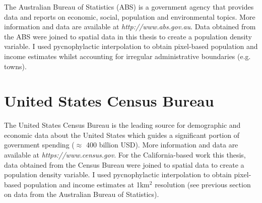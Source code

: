 The Australian Bureau of Statistics (ABS) is a government agency that provides data and reports on economic, social, population and environmental topics. More information and data are available at \textit{http://www.abs.gov.au}. Data obtained from the ABS were joined to spatial data in this thesis to create a population density variable. I used pycnophylactic interpolation \citep{tobl79} to obtain pixel-based population and income estimates whilst accounting for irregular administrative boundaries (e.g. towns).

\section{United States Census Bureau}

The United States Census Bureau is the leading source for demographic and economic data about the United States which guides a significant portion of government spending ($\approx$ 400 billion USD). More information and data are available at \textit{https://www.census.gov}. For the California-based work this thesis, data obtained from the Census Bureau were joined to spatial data to create a population density variable. I used pycnophylactic interpolation to obtain pixel-based population and income estimates at 1km$^2$ resolution (see previous section on data from the Australian Bureau of Statistics).
